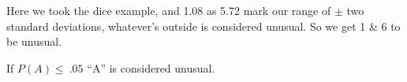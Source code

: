 \begin{figure}[ht]
    \centering
    \label{fig:05-01}
\end{figure}


Here we took the dice example, and 1.08 as 5.72 mark our range of $\pm$ two
standard deviations, whatever's outside is considered unusual. So we get 1 \& 6
to be unusual.

If $P(A) \leq \ .05$ ``A'' is considered unusual.










